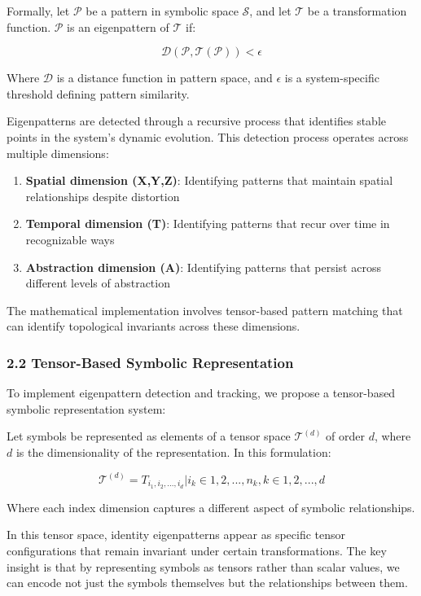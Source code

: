 \documentclass[12pt]{article}
\providecommand{\tightlist}{%
  \setlength{\itemsep}{0pt}\setlength{\parskip}{0pt}}
\begin{document}
Formally, let \(\mathcal{P}\) be a pattern in symbolic space
\(\mathcal{S}\), and let \(\mathcal{T}\) be a transformation function.
\(\mathcal{P}\) is an eigenpattern of \(\mathcal{T}\) if:

\[\mathcal{D}(\mathcal{P}, \mathcal{T}(\mathcal{P})) < \epsilon\]

Where \(\mathcal{D}\) is a distance function in pattern space, and
\(\epsilon\) is a system-specific threshold defining pattern similarity.

Eigenpatterns are detected through a recursive process that identifies
stable points in the system's dynamic evolution. This detection process
operates across multiple dimensions:

\begin{enumerate}
\def\labelenumi{\arabic{enumi}.}
\tightlist
\item
  \textbf{Spatial dimension (X,Y,Z)}: Identifying patterns that maintain
  spatial relationships despite distortion
\item
  \textbf{Temporal dimension (T)}: Identifying patterns that recur over
  time in recognizable ways
\item
  \textbf{Abstraction dimension (A)}: Identifying patterns that persist
  across different levels of abstraction
\end{enumerate}

The mathematical implementation involves tensor-based pattern matching
that can identify topological invariants across these dimensions.

\subsubsection{2.2 Tensor-Based Symbolic
Representation}\label{tensor-based-symbolic-representation}

To implement eigenpattern detection and tracking, we propose a
tensor-based symbolic representation system:

Let symbols be represented as elements of a tensor space
\(\mathcal{T}^{(d)}\) of order \(d\), where \(d\) is the dimensionality
of the representation. In this formulation:

\[\mathcal{T}^{(d)} = {T_{i_1,i_2,...,i_d} | i_k \in {1,2,...,n_k}, k \in {1,2,...,d}}\]

Where each index dimension captures a different aspect of symbolic
relationships.

In this tensor space, identity eigenpatterns appear as specific tensor
configurations that remain invariant under certain transformations. The
key insight is that by representing symbols as tensors rather than
scalar values, we can encode not just the symbols themselves but the
relationships between them.
\end{document}
